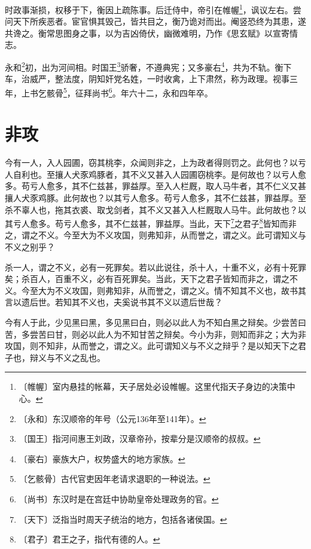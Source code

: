 \documentclass[12pt,UTF-8,openany]{ctexbook}
\begin{document}
\begin{normalsize}
    时政事渐损，权移于下，衡因上疏陈事。后迁侍中，帝引在帷幄\footnote{〔帷幄〕室内悬挂的帐幕，天子居处必设帷幄。这里代指天子身边的决策中心。}，讽议左右。尝问天下所疾恶者。宦官惧其毁己，皆共目之，衡乃诡对而出。阉竖恐终为其患，遂共谗之。衡常思图身之事，以为吉凶倚伏，幽微难明，乃作《思玄赋》以宣寄情志。
    
    永和\footnote{〔永和〕东汉顺帝的年号（公元136年至141年）。}初，出为河间相。时国王\footnote{〔国王〕指河间惠王刘政，汉章帝孙，按辈分是汉顺帝的叔叔。}骄奢，不遵典宪；又多豪右\footnote{〔豪右〕豪族大户，权势盛大的地方家族。}，共为不轨。衡下车，治威严，整法度，阴知奸党名姓，一时收禽，上下肃然，称为政理。视事三年，上书乞骸骨\footnote{〔乞骸骨〕古代官吏因年老请求退职的一种说法。}，征拜尚书\footnote{〔尚书〕东汉时是在宫廷中协助皇帝处理政务的官。}。年六十二，永和四年卒。
\end{normalsize}



\chapter{非攻}

\begin{normalsize}
    
    今有一人，入人园圃，窃其桃李，众闻则非之，上为政者得则罚之。此何也？以亏人自利也。至攘人犬豕鸡豚者，其不义又甚入人园圃窃桃李。是何故也？以亏人愈多。苟亏人愈多，其不仁兹甚，罪益厚。至入人栏厩，取人马牛者，其不仁义又甚攘人犬豕鸡豚。此何故也？以其亏人愈多。苟亏人愈多，其不仁兹甚，罪益厚。至杀不辜人也，拖其衣裘、取戈剑者，其不义又甚入人栏厩取人马牛。此何故也？以其亏人愈多。苟亏人愈多，其不仁兹甚，罪益厚。当此，天下\footnote{〔天下〕泛指当时周天子统治的地方，包括各诸侯国。}之君子\footnote{〔君子〕君王之子，指代有德的人。}皆知而非之，谓之不义。今至大为不义攻国，则弗知非，从而誉之，谓之义。此可谓知义与不义之别乎？
    
    杀一人，谓之不义，必有一死罪矣。若以此说往，杀十人，十重不义，必有十死罪矣；杀百人，百重不义，必有百死罪矣。当此，天下之君子皆知而非之，谓之不义。今至大为不义攻国，则弗知非，从而誉之，谓之义。情不知其不义也，故书其言以遗后世。若知其不义也，夫奚说书其不义以遗后世哉？
    
    今有人于此，少见黑曰黑，多见黑曰白，则必以此人为不知白黑之辩矣。少尝苦曰苦，多尝苦曰甘，则必以此人为不知甘苦之辩矣。今小为非，则知而非之；大为非攻国，则不知非，从而誉之，谓之义。此可谓知义与不义之辩乎？是以知天下之君子也，辩义与不义之乱也。
\end{normalsize}
\end{document}
